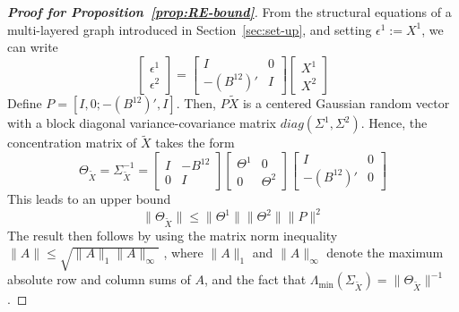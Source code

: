 \medskip
\begin{proof}[\textbf{Proof for Proposition~\ref{prop:RE-bound}}]
	From the structural equations of a multi-layered graph introduced in Section~\ref{sec:set-up}, and setting $\epsilon^1:= X^1$, we can write 
	\begin{equation}\label{eqn:invert-SEM}
	\left[\begin{array}{c}\epsilon^1 \\ \epsilon^2 \end{array} \right] = 
	\left[\begin{array}{cc}I & 0 \\ -(B^{12})' & I \end{array}\right] 
	\left[\begin{array}{c} X^1 \\ X^2 \end{array} \right]
	\end{equation}
	Define $P = [I, 0; -(B^{12})', I]$. Then,  $P \widetilde{X}$ is a centered Gaussian random vector with a block diagonal variance-covariance matrix  $diag(\Sigma^1, \Sigma^2)$. Hence, the concentration matrix of $\widetilde{X}$ takes the form
	\begin{equation*}
	\Theta_{\tilde{X}} = \Sigma^{-1}_{\tilde{X}} = \left[ \begin{array}{cc}I & -B^{12} \\ 0 & I\end{array} \right] \left[ \begin{array}{cc} \Theta^1 & 0 \\ 0 & \Theta^2 \end{array} \right] \left[\begin{array}{cc}I & 0 \\ -(B^{12})' & 0  \end{array} \right]
	\end{equation*}
	This leads to an upper bound  
	\begin{equation*}
	\| \Theta_{\widetilde{X}} \| \le \| \Theta^1 \| \| \Theta^2 \| \|P\|^2
	\end{equation*}
	The result then follows by using the matrix norm inequality $\|A\| \le \sqrt{\|A\|_1 \|A\|_{\infty}}$ \citep{golub2012matrix}, where $\|A\|_1$ and $\|A\|_{\infty}$ denote the maximum absolute row and column sums of $A$, and the fact that $\Lambda_{\min}(\Sigma_{\tilde{X}}) = \| \Theta_{\tilde{X}} \|^{-1}$. 
\end{proof}
